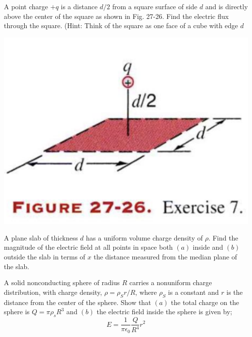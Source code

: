 \documentclass[11pt,letterpaper,boxed]{hmcpset}
\begin{document}
\begin{solution}
\vfill
\end{solution}
\newpage

\begin{problem}[HRK P27.7]
A point charge $+q$ is a distance $d/2$ from a square surface of side $d$ and is directly above the center of the square as shown in Fig. 27-26. Find the electric flux through the square. (Hint: Think of the square as one face of a cube with edge $d$ 
\begin{center}
\includegraphics[scale=0.6]{27-26.png}
\end{center} 

\end{problem}

\begin{solution}
\vfill
\end{solution}
\newpage

\begin{problem}[HRK P27.16	]
A plane slab of thickness $d$ has a uniform volume charge density of $\rho$. Find the magnitude of the electric field at all points in space both $(a)$ inside and $(b)$ outside the slab in terms of $x$ the distance measured from the median plane of the slab. 
\end{problem}

\begin{solution}
\vfill
\end{solution}
\newpage

\begin{problem}[HRK P27.17]
A solid nonconducting sphere of radius $R$ carries a nonuniform charge distribution, with charge density, $\rho= \rho_Sr/R$, where $\rho_S$ is a constant and $r$ is the distance from the center of the sphere. Show that $(a)$ the total charge on the sphere  is $Q= \pi \rho_sR^3$ and $(b)$ the electric field inside the sphere is given by; 
$$ E = \frac{1}{\pi \epsilon_0}\frac{Q}{R^4}r^2$$
\end{problem}
\end{document}

